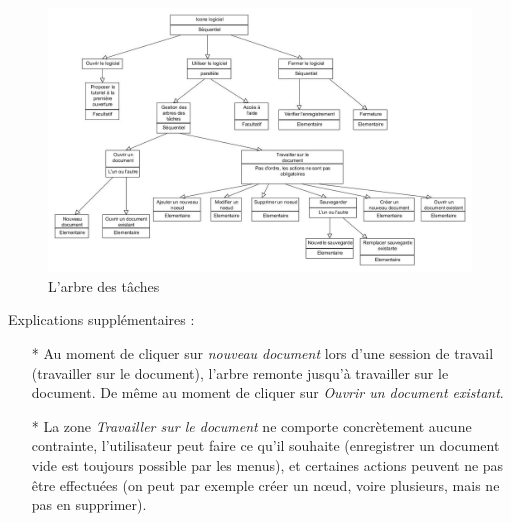 \documentclass[12pt, a4paper]{article}
\begin{document}
\begin{figure}[h]
\begin{center}
   \includegraphics[scale = 0.4]{arbre-des-taches.jpg}
	\caption{L'arbre des tâches}
	\end{center}
\end{figure}


Explications supplémentaires : 
\begin{itemize}
\item [*]Au moment de cliquer sur \emph{nouveau document} lors d'une session de travail (travailler sur le document), l'arbre remonte jusqu'à travailler sur le document. De même au moment de cliquer sur \emph{Ouvrir un document existant}.
\item [*]La zone \emph{Travailler sur le document} ne comporte concrètement aucune contrainte, l'utilisateur peut faire ce qu'il souhaite (enregistrer un document vide est toujours possible par les menus), et certaines actions peuvent ne pas être effectuées (on peut par exemple créer un nœud, voire plusieurs, mais ne pas en supprimer).
\end{itemize}
\end{document}
